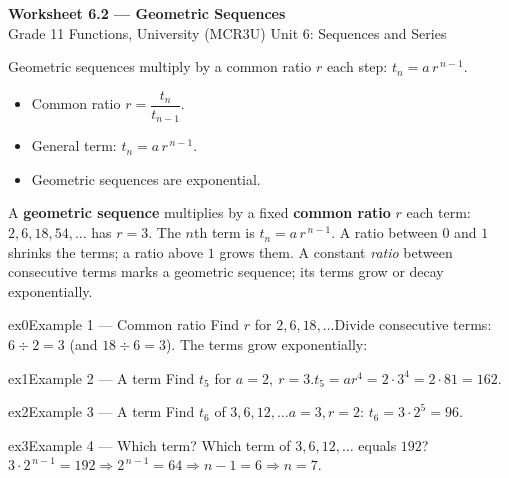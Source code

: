 \documentclass[11pt]{article}
\begin{document}
\begin{center}
{\LARGE\bfseries\color{titleblue}Worksheet 6.2 --- Geometric Sequences}\\[2pt]
{\small Grade 11 Functions, University (MCR3U) \textperiodcentered{} Unit 6: Sequences and Series}
\end{center}

\begin{ideabox}
Geometric sequences multiply by a common ratio $r$ each step: $t_n=a\,r^{\,n-1}$.
\begin{itemize}[leftmargin=*,itemsep=2pt]
  \item Common ratio $r=\dfrac{t_n}{t_{n-1}}$.
  \item General term: $t_n=a\,r^{\,n-1}$.
  \item Geometric sequences are exponential.
\end{itemize}
\end{ideabox}

\begin{learnbox}
A \textbf{geometric sequence} multiplies by a fixed \textbf{common ratio} $r$ each term: $2, 6, 18, 54,\dots$ has $r=3$.
The $n$th term is $t_n=a\,r^{\,n-1}$. A ratio between $0$ and $1$ shrinks the terms; a ratio above $1$ grows them.
A constant \emph{ratio} between consecutive terms marks a geometric sequence; its terms grow or decay exponentially.
\end{learnbox}


\begin{example}{ex0}{Example 1 --- Common ratio}
Find $r$ for $2,6,18,\dots$\soln Divide consecutive terms: $6\div2=3$ (and $18\div6=3$). The terms grow exponentially:
\end{example}

\begin{example}{ex1}{Example 2 --- A term}
Find $t_5$ for $a=2,\ r=3$.\soln $t_5=a r^{4}=2\cdot3^{4}=2\cdot81=162$.
\end{example}

\begin{example}{ex2}{Example 3 --- A term}
Find $t_6$ of $3,6,12,\dots$\soln $a=3,r=2$: $t_6=3\cdot2^{5}=96$.
\end{example}

\begin{example}{ex3}{Example 4 --- Which term?}
Which term of $3,6,12,\dots$ equals $192$?\soln $3\cdot2^{\,n-1}=192\Rightarrow 2^{\,n-1}=64\Rightarrow n-1=6\Rightarrow n=7$.
\end{example}
\end{document}
